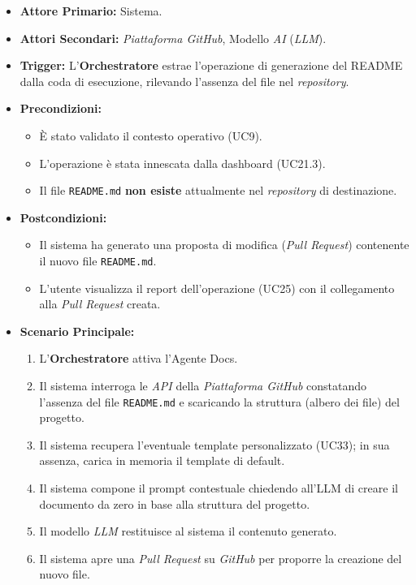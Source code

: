 \documentclass[12pt, a4paper]{article}
\begin{document}
\begin{itemize}
    \item \textbf{Attore Primario:} Sistema.
    \item \textbf{Attori Secondari:} \textit{Piattaforma GitHub}, Modello \textit{AI} (\textit{LLM}).
    \item \textbf{Trigger:} L'\textbf{Orchestratore} estrae l'operazione di generazione del README dalla coda di esecuzione, rilevando l'assenza del file nel \textit{repository}.
    \item \textbf{Precondizioni:}
    \begin{itemize}
        \item È stato validato il contesto operativo (UC9).
        \item L'operazione è stata innescata dalla dashboard (UC21.3).
        \item Il file \texttt{README.md} \textbf{non esiste} attualmente nel \textit{repository} di destinazione.
    \end{itemize}
    \item \textbf{Postcondizioni:}
    \begin{itemize}
        \item Il sistema ha generato una proposta di modifica (\textit{Pull Request}) contenente il nuovo file \texttt{README.md}.
        \item L'utente visualizza il report dell'operazione (UC25) con il collegamento alla \textit{Pull Request} creata.
    \end{itemize}
    \item \textbf{Scenario Principale:}
    \begin{enumerate}
        \item L'\textbf{Orchestratore} attiva l'Agente Docs.
        \item Il sistema interroga le \textit{API} della \textit{Piattaforma GitHub} constatando l'assenza del file \texttt{README.md} e scaricando la struttura (albero dei file) del progetto.
        \item Il sistema recupera l'eventuale template personalizzato (UC33); in sua assenza, carica in memoria il template di default.
        \item Il sistema compone il prompt contestuale chiedendo all'LLM di creare il documento da zero in base alla struttura del progetto.
        \item Il modello \textit{LLM} restituisce al sistema il contenuto generato.
        \item Il sistema apre una \textit{Pull Request} su \textit{GitHub} per proporre la creazione del nuovo file.

\end{enumerate}
\end{itemize}
\end{document}
